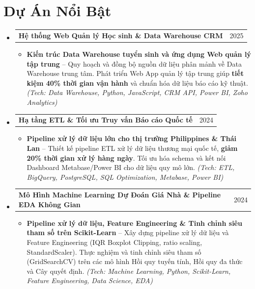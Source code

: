 \documentclass[letterpaper,11pt]{article}
\makeatletter
\newcommand{\resumeItem}[1]{
  \item\small{
    {#1 \vspace{1pt}}
  }
}
\newcommand{\resumeProjectHeading}[2]{
    \vspace{2pt}\item
    \begin{tabular*}{\textwidth}{l@{\extracolsep{\fill}}r}
      \small#1 & #2 \\
    \end{tabular*}\vspace{-2pt}
}
\newcommand{\resumeSubHeadingListStart}{\begin{itemize}[leftmargin=0.15in, label={}]}
\newcommand{\resumeSubHeadingListEnd}{\end{itemize}}
\newcommand{\resumeItemListStart}{\begin{itemize}[leftmargin=0.15in, itemsep=2.5pt, topsep=2pt, parsep=1.5pt]}
\newcommand{\resumeItemListEnd}{\end{itemize}\vspace{2pt}}
\makeatother
\begin{document}
\section*{Dự Án Nổi Bật}
  \resumeSubHeadingListStart
        \resumeProjectHeading
      {\textbf{Hệ thống Web Quản lý Học sinh \& Data Warehouse CRM}}{2025}
      \resumeItemListStart
        \resumeItem{\textbf{Kiến trúc Data Warehouse tuyển sinh và ứng dụng Web quản lý tập trung} -- Quy hoạch và đồng bộ nguồn dữ liệu phân mảnh về Data Warehouse trung tâm. Phát triển Web App quản lý tập trung giúp \textbf{tiết kiệm 40\% thời gian vận hành} và chuẩn hóa dữ liệu báo cáo kỹ thuật. \emph{(Tech: Data Warehouse, Python, JavaScript, CRM API, Power BI, Zoho Analytics)}}
      \resumeItemListEnd
    \resumeProjectHeading
      {\textbf{Hạ tầng ETL \& Tối ưu Truy vấn Báo cáo Quốc tế}}{2024}
      \resumeItemListStart
        \resumeItem{\textbf{Pipeline xử lý dữ liệu lớn cho thị trường Philippines \& Thái Lan} -- Thiết kế pipeline ETL xử lý dữ liệu thương mại quốc tế, \textbf{giảm 20\% thời gian xử lý hàng ngày}. Tối ưu hóa schema và kết nối Dashboard Metabase/Power BI cho dữ liệu quy mô lớn. \emph{(Tech: ETL, BigQuery, PostgreSQL, SQL Optimization, Metabase, Power BI)}}
      \resumeItemListEnd
    \resumeProjectHeading
      {\textbf{Mô Hình Machine Learning Dự Đoán Giá Nhà \& Pipeline EDA Không Gian}}{2024}
      \resumeItemListStart
        \resumeItem{\textbf{Pipeline xử lý dữ liệu, Feature Engineering \& Tinh chỉnh siêu tham số trên Scikit-Learn} -- Xây dựng pipeline xử lý dữ liệu và Feature Engineering (IQR Boxplot Clipping, ratio scaling, StandardScaler). Thực nghiệm và tinh chỉnh siêu tham số (GridSearchCV) trên các mô hình Hồi quy tuyến tính, Hồi quy đa thức và Cây quyết định. \emph{(Tech: Machine Learning, Python, Scikit-Learn, Feature Engineering, Data Science, EDA)}}
      \resumeItemListEnd
  \resumeSubHeadingListEnd

\end{document}
